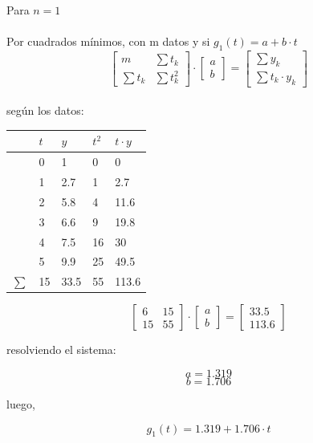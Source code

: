 \documentclass{article}
\begin{document}
Para $n=1$\\\\
Por cuadrados mínimos, con m datos y si 
$g_1(t)=a+ b \cdot t$
\[
\begin{bmatrix}
    m & \sum{t_k} \\
    \sum{t_k} & \sum{t_k^2}
\end{bmatrix}
\cdot
\begin{bmatrix}
    a \\ b
\end{bmatrix}
=
\begin{bmatrix}
    \sum{y_k} \\
    \sum{t_k \cdot y_k}
\end{bmatrix}
\]\\

según los datos:

\begin{table}[H]
\centering
\begin{tabular}{|l|l|l|l|l|}
\hline
  & $t$  & $y$    & $t^2$ & $t \cdot y$   \\ \hline
  & 0  & 1    & 0  & 0     \\
  & 1  & 2.7  & 1  & 2.7   \\
  & 2  & 5.8  & 4  & 11.6  \\
  & 3  & 6.6  & 9  & 19.8  \\
  & 4  & 7.5  & 16 & 30    \\
  & 5  & 9.9  & 25 & 49.5  \\ \hline
$\sum $ & 15 & 33.5 & 55 & 113.6 \\ \hline
\end{tabular}
\end{table}

\[
\begin{bmatrix}
    6 & 15 \\
    15 & 55
\end{bmatrix}
\cdot
\begin{bmatrix}
    a \\ b
\end{bmatrix}
=
\begin{bmatrix}
    33.5 \\
    113.6
\end{bmatrix}
\]

resolviendo el sistema:

\[
a = 1.319
\]
\[
b = 1.706
\]

luego,

\[g_1(t)= 1.319 + 1.706 \cdot t\]
\end{document}

